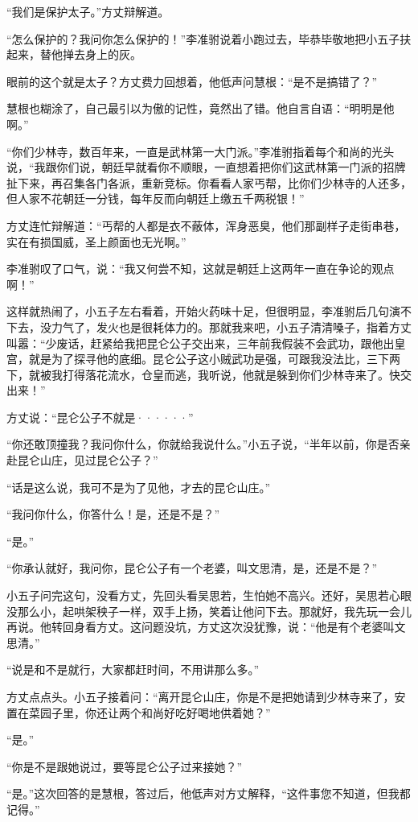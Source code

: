“我们是保护太子。”方丈辩解道。

“怎么保护的？我问你怎么保护的！”李准驸说着小跑过去，毕恭毕敬地把小五子扶起来，替他掸去身上的灰。

眼前的这个就是太子？方丈费力回想着，他低声问慧根：“是不是搞错了？”

慧根也糊涂了，自己最引以为傲的记性，竟然出了错。他自言自语：“明明是他啊。”

“你们少林寺，数百年来，一直是武林第一大门派。”李准驸指着每个和尚的光头说，“我跟你们说，朝廷早就看你不顺眼，一直想着把你们这武林第一门派的招牌扯下来，再召集各门各派，重新竞标。你看看人家丐帮，比你们少林寺的人还多，但人家不花朝廷一分钱，每年反而向朝廷上缴五千两税银！”

方丈连忙辩解道：“丐帮的人都是衣不蔽体，浑身恶臭，他们那副样子走街串巷，实在有损国威，圣上颜面也无光啊。”

李准驸叹了口气，说：“我又何尝不知，这就是朝廷上这两年一直在争论的观点啊！”

这样就热闹了，小五子左右看着，开始火药味十足，但很明显，李准驸后几句演不下去，没力气了，发火也是很耗体力的。那就我来吧，小五子清清嗓子，指着方丈叫嚣：“少废话，赶紧给我把昆仑公子交出来，三年前我假装不会武功，跟他出皇宫，就是为了探寻他的底细。昆仑公子这小贼武功是强，可跟我没法比，三下两下，就被我打得落花流水，仓皇而逃，我听说，他就是躲到你们少林寺来了。快交出来！”

方丈说：“昆仑公子不就是······”

“你还敢顶撞我？我问你什么，你就给我说什么。”小五子说，“半年以前，你是否亲赴昆仑山庄，见过昆仑公子？”

“话是这么说，我可不是为了见他，才去的昆仑山庄。”

“我问你什么，你答什么！是，还是不是？”

“是。”

“你承认就好，我问你，昆仑公子有一个老婆，叫文思清，是，还是不是？”

小五子问完这句，没看方丈，先回头看吴思若，生怕她不高兴。还好，吴思若心眼没那么小，起哄架秧子一样，双手上扬，笑着让他问下去。那就好，我先玩一会儿再说。他转回身看方丈。这问题没坑，方丈这次没犹豫，说：“他是有个老婆叫文思清。”

“说是和不是就行，大家都赶时间，不用讲那么多。”

方丈点点头。小五子接着问：“离开昆仑山庄，你是不是把她请到少林寺来了，安置在菜园子里，你还让两个和尚好吃好喝地供着她？”

“是。”

“你是不是跟她说过，要等昆仑公子过来接她？”

“是。”这次回答的是慧根，答过后，他低声对方丈解释，“这件事您不知道，但我都记得。”


